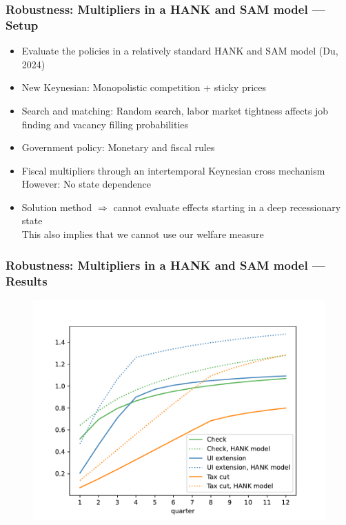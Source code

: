 \documentclass[pdflatex,aspectratio=169, handout]{beamer}
\begin{document}
\begin{frame}
\frametitle{Robustness: Multipliers in a HANK and SAM model --- Setup}
\begin{itemize}
\itemsep = .5\bigskipamount 
\item Evaluate the policies in a relatively standard HANK and SAM model (Du, 2024)
\item New Keynesian: Monopolistic competition + sticky prices
\item Search and matching: Random search, labor market tightness affects job finding and vacancy filling probabilities 
\item Government policy: Monetary and fiscal rules 
\item Fiscal multipliers through an intertemporal Keynesian cross mechanism \\[1ex]
However: No state dependence 
\item Solution method $\Rightarrow$ cannot evaluate effects starting in a deep recessionary state \\[1ex]
This also implies that we cannot use our welfare measure 
\end{itemize}
\end{frame}

\begin{frame}
\frametitle{Robustness: Multipliers in a HANK and SAM model --- Results}
\begin{figure}
\begin{center}
\includegraphics[scale=0.6]{Code/HA-Models/FromPandemicCode/Figures/Cummulative_multipliers_withHank}	
\end{center}
\vspace{0.2cm}
\end{figure}
\end{frame}
\end{document}
